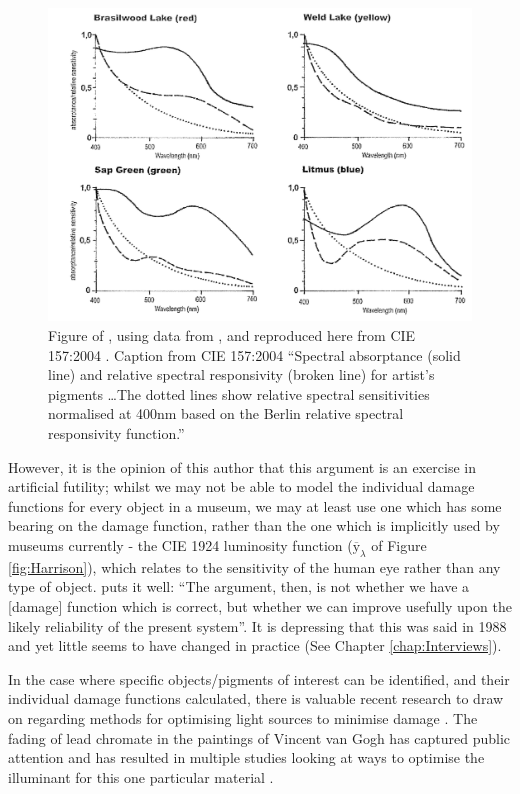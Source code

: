 \begin{figure}[htbp]
\includegraphics[max width=\textwidth]{figs/LitRev/Cuttle.png}
\caption{Figure of \citet{cuttle_control_1999}, using data from \citet{saunders_wavelength-dependent_1994}, and reproduced here from CIE 157:2004 \citep{cie_cie_2004}. Caption from CIE 157:2004 ``Spectral absorptance (solid line) and relative spectral responsivity (broken line) for artist's pigments \dots The dotted lines show relative spectral sensitivities normalised at 400nm based on the Berlin relative spectral responsivity function.''}
\label{fig:Cuttle}
\end{figure}

However, it is the opinion of this author that this argument is an exercise in artificial futility; whilst we may not be able to model the individual damage functions for every object in a museum, we may at least use one which has some bearing on the damage function, rather than the one which is implicitly used by museums currently - the CIE 1924 luminosity function ($\overline{\mathrm{y}}_{\lambda}$ of Figure \ref{fig:Harrison}), which relates to the sensitivity of the human eye rather than any type of object. \citet{cuttle_lighting_1988} puts it well: ``The argument, then, is not whether we have a [damage] function which is correct, but whether we can improve usefully upon the likely reliability of the present system''. It is depressing that this was said in 1988 and yet little seems to have changed in practice (See Chapter \ref{chap:Interviews}).

In the case where specific objects/pigments of interest can be identified, and their individual damage functions calculated, there is valuable recent research to draw on regarding methods for optimising light sources to minimise damage \citep{durmus_optimising_2017,durmus_colour_2015,durmus_optimising_2015,durmus_object_2017}. The fading of lead chromate in the paintings of Vincent van Gogh has captured public attention \citep{lewis_smith_will_2013} and has resulted in multiple studies looking at ways to optimise the illuminant for this one particular material \citep{lunz_can_2017,monico_degradation_2011}.

